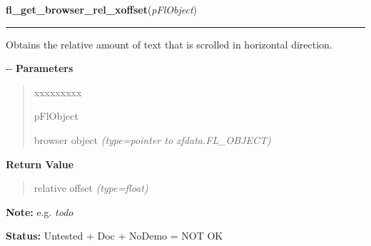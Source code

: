     \vspace{0.5ex}

\hspace{.8\funcindent}\begin{boxedminipage}{\funcwidth}

    \raggedright \textbf{fl\_get\_browser\_rel\_xoffset}(\textit{pFlObject})

    \vspace{-1.5ex}

    \rule{\textwidth}{0.5\fboxrule}
\setlength{\parskip}{2ex}

Obtains the relative amount of text that is scrolled in horizontal
direction.

-{}-
\setlength{\parskip}{1ex}
      \textbf{Parameters}
      \vspace{-1ex}

      \begin{quote}
        \begin{Ventry}{xxxxxxxxx}

          \item[pFlObject]


browser object
            {\it (type=pointer to xfdata.FL\_OBJECT)}

        \end{Ventry}

      \end{quote}

      \textbf{Return Value}
    \vspace{-1ex}

      \begin{quote}

relative offset
      {\it (type=float)}

      \end{quote}

\textbf{Note:} 
e.g. \emph{todo}


\textbf{Status:} 
Untested + Doc + NoDemo = NOT OK


    \end{boxedminipage}

    \label{xformslib:flbrowser:fl_set_browser_xoffset}

    \vspace{0.5ex}

